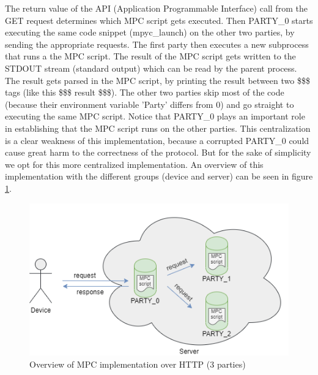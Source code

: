 The return value of the API (Application Programmable Interface) call from the GET request determines which MPC script gets executed. Then PARTY\_0 starts executing the same code snippet (mpyc\_launch) on the other two parties, by sending the appropriate requests. The first party then executes a new subprocess that runs a the MPC script. The result of the MPC script gets written to the STDOUT stream (standard output) which can be read by the parent process. The result gets parsed in the MPC script, by printing the result between two \$\$\$ tags (like this \$\$\$ result \$\$\$). The other two parties skip most of the code (because their environment variable 'Party' differs from 0) and go straight to executing the same MPC script. Notice that PARTY\_0 plays an important role in establishing that the MPC script runs on the other parties. This centralization is a clear weakness of this implementation, because a corrupted PARTY\_0 could cause great harm to the correctness of the protocol. But for the sake of simplicity we opt for this more centralized implementation. An overview of this implementation with the different groups (device and server) can be seen in figure \ref{fig:implementationoverview}.

\begin{figure}[H]
  \includegraphics[scale=0.75]{fig/implementationoverview.png}
  \centering
  \caption{Overview of MPC implementation over HTTP (3 parties)}
  \label{fig:implementationoverview}
\end{figure}

